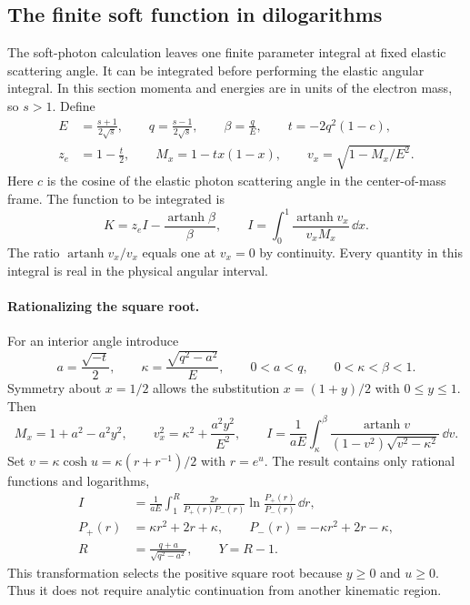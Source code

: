 \subsection{The finite soft function in dilogarithms}
\label{sec:comp-supp-soft-analytic}
The soft-photon calculation leaves one finite parameter integral at
fixed elastic scattering angle. It can be integrated before performing
the elastic angular integral. In this section momenta and energies are
in units of the electron mass, so $s>1$. Define
\begin{align}
 E&=\frac{s+1}{2\sqrt{s}},\qquad q=\frac{s-1}{2\sqrt{s}},
 \qquad \beta=\frac qE,\qquad t=-2q^2(1-c),\\
 z_e&=1-\frac t2,\qquad M_x=1-tx(1-x),
 \qquad v_x=\sqrt{1-M_x/E^2}.
\end{align}
Here $c$ is the cosine of the elastic photon scattering angle in the
center-of-mass frame. The function to be integrated is
\begin{equation}
 K=z_e I-\frac{\operatorname{artanh}\beta}{\beta},
 \qquad
 I=\int_0^1\frac{\operatorname{artanh}v_x}{v_xM_x}\,\dd x.
 \label{eq:comp-soft-I-definition}
\end{equation}
The ratio $\operatorname{artanh}v_x/v_x$ equals one at $v_x=0$ by continuity.
Every quantity in this integral is real in the physical angular interval.

\paragraph{Rationalizing the square root.}
For an interior angle introduce
\begin{equation}
 a=\frac{\sqrt{-t}}2,\qquad
 \kappa=\frac{\sqrt{q^2-a^2}}E,\qquad
 0<a<q,\qquad 0<\kappa<\beta<1.
\end{equation}
Symmetry about $x=1/2$ allows the substitution $x=(1+y)/2$ with
$0\leq y\leq1$. Then
\begin{equation}
 M_x=1+a^2-a^2y^2,\qquad
 v_x^2=\kappa^2+\frac{a^2y^2}{E^2},\qquad
 I=\frac1{aE}\int_\kappa^\beta
 \frac{\operatorname{artanh}v}{(1-v^2)\sqrt{v^2-\kappa^2}}\,\dd v.
\end{equation}
Set $v=\kappa\cosh u=\kappa(r+r^{-1})/2$ with $r=e^u$.
The result contains only rational functions and logarithms,
\begin{align}
 I&=\frac1{aE}\int_1^{R}
 \frac{2r}{P_+(r)P_-(r)}
 \ln\frac{P_+(r)}{P_-(r)}\,\dd r,
 \label{eq:comp-soft-rational-integral}\\
 P_+(r)&=\kappa r^2+2r+\kappa,\qquad
 P_-(r)=-\kappa r^2+2r-\kappa,\\
 R&=\frac{q+a}{\sqrt{q^2-a^2}},\qquad Y=R-1.
\end{align}
This transformation selects the positive square root because $y\geq0$
and $u\geq0$. Thus it does not require analytic continuation from another
kinematic region.

